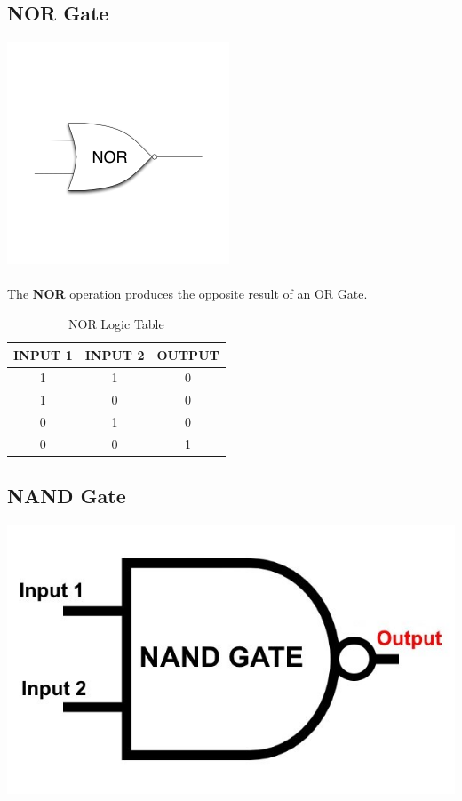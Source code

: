 \documentclass{article}
\begin{document}
\newpage 
\subsection{NOR Gate}
\includegraphics{nor}
\paragraph{}
The \textbf{NOR} operation produces the opposite result of an OR Gate.
\begin{table}[h]
	\centering
	\label{tab:table4}
	\caption{NOR Logic Table}
	\begin{tabular}{|c|c|c|}
		INPUT 1 & INPUT 2 & OUTPUT\\
		\hline
		1&1&0\\
		1&0&0\\
		0&1&0\\
		0&0&1\\
	\end{tabular}
\end{table}

\newpage

\subsection{NAND Gate}
\includegraphics[width=0.7\linewidth]{nand}
\end{document}
